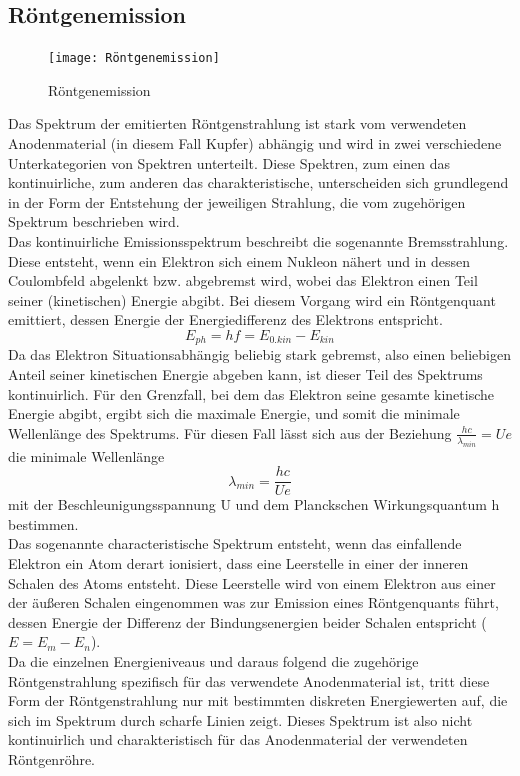\subsection{Röntgenemission}
\begin{figure}[h]
    \centering
    \texttt{[image: Röntgenemission]}
    \caption{Röntgenemission}
\end{figure}
Das Spektrum der emitierten Röntgenstrahlung ist stark vom verwendeten Anodenmaterial (in diesem Fall Kupfer) abhängig und wird in zwei verschiedene Unterkategorien von Spektren unterteilt. Diese Spektren, zum einen das kontinuirliche, zum anderen das charakteristische, unterscheiden sich grundlegend in der Form der Entstehung der jeweiligen Strahlung, die vom zugehörigen Spektrum beschrieben wird. \\
Das kontinuirliche Emissionsspektrum beschreibt die sogenannte Bremsstrahlung. Diese entsteht, wenn ein Elektron sich einem Nukleon nähert und in dessen Coulombfeld abgelenkt bzw. abgebremst wird, wobei das Elektron einen Teil seiner (kinetischen) Energie abgibt. Bei diesem Vorgang wird ein Röntgenquant emittiert, dessen Energie der Energiedifferenz des Elektrons entspricht.
\begin{equation}
E_{ph}=hf=E_{0.kin}-E_{kin}
\end{equation}
Da das Elektron Situationsabhängig beliebig stark gebremst, also einen beliebigen Anteil seiner kinetischen Energie abgeben kann, ist dieser Teil des Spektrums kontinuirlich. Für den Grenzfall, bei dem das Elektron seine gesamte kinetische Energie abgibt, ergibt sich die maximale Energie, und somit die minimale Wellenlänge des Spektrums. Für diesen Fall lässt sich aus der Beziehung $\frac{hc}{\lambda_{min}}=Ue$ die minimale Wellenlänge
\begin{equation}
\lambda_{min}=\frac{hc}{Ue}
\end{equation}
mit der Beschleunigungsspannung U und dem Planckschen Wirkungsquantum h bestimmen. \\
Das sogenannte characteristische Spektrum entsteht, wenn das einfallende Elektron ein Atom derart ionisiert, dass eine Leerstelle in einer der inneren Schalen des Atoms entsteht. Diese Leerstelle wird von einem Elektron aus einer der äußeren Schalen eingenommen was zur Emission eines Röntgenquants führt, dessen Energie der Differenz der Bindungsenergien beider Schalen entspricht ($E=E_m-E_n$). \\
Da die einzelnen Energieniveaus und daraus folgend die zugehörige Röntgenstrahlung spezifisch für das verwendete Anodenmaterial ist, tritt diese Form der Röntgenstrahlung nur mit bestimmten diskreten Energiewerten auf, die sich im Spektrum durch scharfe Linien zeigt. Dieses Spektrum ist also nicht kontinuirlich und charakteristisch für das Anodenmaterial der verwendeten Röntgenröhre. \\
